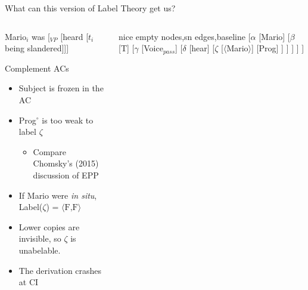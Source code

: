 \documentclass[Proposal]{subfiles}
\begin{document}
\begin{frame}
  {What can this version of Label Theory get us?}

    \begin{columns}
    \begin{column}[T]{0.6\textwidth}
      {\rm *Mario$_i$ was [$_{VP}$ [heard [$t_i$ being slandered]]]}
      \begin{block}
	{Complement ACs}
	\begin{itemize}
	  \item Subject is frozen in the AC
	  \item Prog$^\circ$ is too weak to label $\zeta$
	    \begin{itemize}
	      \item Compare Chomsky's (2015) discussion of EPP
	    \end{itemize}
	  \item If {\rm Mario} were \textit{in situ}, Label($\zeta$) = $\langle\text{F,F}\rangle$
	  \item Lower copies are invisible, so $\zeta$ is unabelable.
	  \item The derivation crashes at CI
	\end{itemize}
      \end{block}
    \end{column}
    \begin{column}[T]{0.4\textwidth}
	{\small
	  \begin{forest}
	    nice empty nodes,sn edges,baseline
	    [$\alpha$
	      [{\rm Mario}]
	      [$\beta$
		[T]
		[$\gamma$
		  [Voice$_{pass}$]
		  [$\delta$
		    [{\rm hear}]
		    [$\zeta$
		      [$\langle${\rm Mario}$\rangle$]
		      [Prog]
		    ]
		  ]
		]
	      ]
	    ]
	  \end{forest}
	}
    \end{column}
  \end{columns}
\end{frame}
\end{document}

